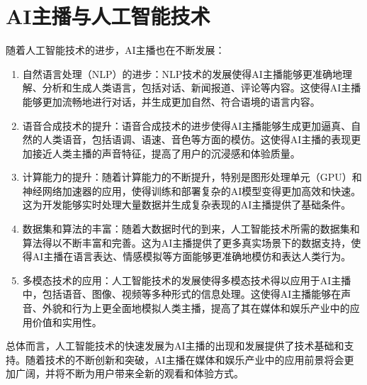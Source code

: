 \documentclass[11pt, a4paper, oneside]{ctexbook}
\begin{document}
\section{AI主播与人工智能技术}
随着人工智能技术的进步，AI主播也在不断发展：

\begin{enumerate}
    \item 自然语言处理（NLP）的进步：NLP技术的发展使得AI主播能够更准确地理解、分析和生成人类语言，包括对话、新闻报道、评论等内容。这使得AI主播能够更加流畅地进行对话，并生成更加自然、符合语境的语言内容。
    \item 语音合成技术的提升：语音合成技术的进步使得AI主播能够生成更加逼真、自然的人类语音，包括语调、语速、音色等方面的模仿。这使得AI主播的表现更加接近人类主播的声音特征，提高了用户的沉浸感和体验质量。
    \item 计算能力的提升：随着计算能力的不断提升，特别是图形处理单元（GPU）和神经网络加速器的应用，使得训练和部署复杂的AI模型变得更加高效和快速。这为开发能够实时处理大量数据并生成复杂表现的AI主播提供了基础条件。
    \item 数据集和算法的丰富：随着大数据时代的到来，人工智能技术所需的数据集和算法得以不断丰富和完善。这为AI主播提供了更多真实场景下的数据支持，使得AI主播在语言表达、情感模拟等方面能够更准确地模仿和表达人类行为。
    \item 多模态技术的应用：人工智能技术的发展使得多模态技术得以应用于AI主播中，包括语音、图像、视频等多种形式的信息处理。这使得AI主播能够在声音、外貌和行为上更全面地模拟人类主播，提高了其在媒体和娱乐产业中的应用价值和实用性。
\end{enumerate}

总体而言，人工智能技术的快速发展为AI主播的出现和发展提供了技术基础和支持。随着技术的不断创新和突破，AI主播在媒体和娱乐产业中的应用前景将会更加广阔，并将不断为用户带来全新的观看和体验方式。
\end{document}
